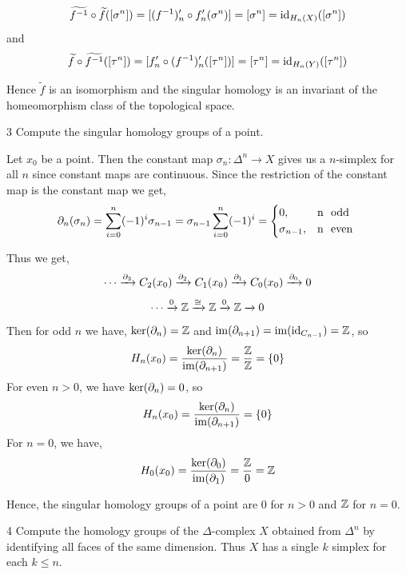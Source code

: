 \documentclass[12pt]{article}
\begin{document}
\begin{solution}
\begin{itemize}
        \[\widetilde{f^{-1}} \circ \widetilde{f} ([\sigma^n]) = [(f^{-1})_n' \circ f'_n(\sigma^n)] = [\sigma^n] = \operatorname{id}_{H_n(X)}([\sigma^n])\]
        and 
        \[\widetilde{f} \circ \widetilde{f^{-1}} ([\tau^n]) = [f'_n \circ (f^{-1})'_n([\tau^n])] = [\tau^n] = \operatorname{id}_{H_n(Y)}([\tau^n])\] 
    \end{itemize}

   Hence $\widetilde{f}$ is an isomorphism and the singular homology is an invariant of the homeomorphism class of the topological space. 
\end{solution}

\newpage


\begin{problem}{3}
    Compute the singular homology groups of a point.
\end{problem}

\begin{solution}
    \bbni

    Let $x_0$ be a point. Then the constant map $\sigma_n: \Delta^n \to X$ gives us a $n$-simplex for all $n$ since constant maps are continuous. Since the restriction of the constant map is the constant map we get, 
    \[\d_n(\sigma_n) = \sum_{i=0}^n (-1)^i \sigma_{n-1} = \sigma_{n-1} \sum_{i=0}^n (-1)^i = \begin{cases*}
        0 ,& n \text{ odd} \\ 
        \sigma_{n-1}, & n \text{ even} \\ 
    \end{cases*}\]

    Thus we get, 
    \[\cdots \xrightarrow{\partial_3} C_2(x_0) \xrightarrow{\partial_2} C_1(x_0) \xrightarrow{\partial_1} C_0(x_0) \xrightarrow{\partial_0} 0 \]
    \[\cdots \xrightarrow{0} \mathbb Z \xrightarrow{\cong} \mathbb Z \xrightarrow{0} \mathbb Z \xrightarrow{} 0 \]
    Then for odd $n$ we have, 
    $\ker(\partial_n) = \mathbb Z$ and $\operatorname{im}(\partial_{n+1}) = \operatorname{im}(\operatorname{id}_{C_{n-1}}) = \mathbb Z$, so
    \[H_n(x_0) = \frac{\ker(\partial_n)}{\operatorname{im}(\partial_{n+1})} = \frac{\mathbb Z}{\mathbb Z} = \{0\}\]
    For even $n > 0$, we have
    $\ker(\partial_n) = 0$,  so
    \[H_n(x_0) = \frac{\ker(\partial_n)}{\operatorname{im}(\partial_{n+1})} = \{0\}\]
    For $n = 0$, we have,
    \[H_0(x_0) = \frac{\ker(\partial_0)}{\operatorname{im}(\partial_{1})} = \frac{\mathbb Z}{0} = \mathbb Z\]

    Hence, the singular homology groups of a point are $0$ for $n > 0$ and $\mathbb Z$ for $n = 0$. 
\end{solution}

\newpage 

\begin{problem} {4}
     Compute the homology groups of the $\Delta$-complex $X$ obtained from $\Delta^n$ by identifying all faces of the same dimension. Thus $X$ has a single $k$ simplex for each $k \leq n$.
\end{problem}
\end{document}
